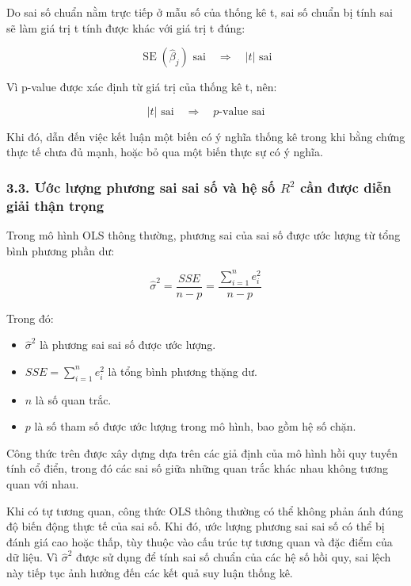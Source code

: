 Do sai số chuẩn nằm trực tiếp ở mẫu số của thống kê t, sai số chuẩn bị tính sai sẽ làm giá trị t tính được khác với giá trị t đúng:

\[
\widehat{\operatorname{SE}}(\hat{\beta}_j)
\text{ sai}
\quad \Rightarrow \quad
|t|
\text{ sai}
\]

Vì p-value được xác định từ giá trị của thống kê t, nên:

\[
|t|
\text{ sai}
\quad \Rightarrow \quad
p\text{-value sai}
\]

Khi đó, dẫn đến việc kết luận một biến có ý nghĩa thống kê trong khi bằng chứng thực tế chưa đủ mạnh, hoặc bỏ qua một biến thực sự có ý nghĩa.


\subsubsection{3.3. Ước lượng phương sai sai số và hệ số $R^2$ cần được diễn giải thận trọng}

Trong mô hình OLS thông thường, phương sai của sai số được ước lượng từ tổng bình phương phần dư:

\[
\hat{\sigma}^2
=
\frac{SSE}{n-p}
=
\frac{\sum_{i=1}^{n}e_i^2}{n-p}
\]

Trong đó:

\begin{itemize}
    \item $\hat{\sigma}^2$ là phương sai sai số được ước lượng.
    
    \item $SSE=\sum_{i=1}^{n}e_i^2$ là tổng bình phương thặng dư.
    
    \item $n$ là số quan trắc.
    
    \item $p$ là số tham số được ước lượng trong mô hình, bao gồm hệ số chặn.
\end{itemize}

Công thức trên được xây dựng dựa trên các giả định của mô hình hồi quy tuyến tính cổ điển, trong đó các sai số giữa những quan trắc khác nhau không tương quan với nhau.

Khi có tự tương quan, công thức OLS thông thường có thể không phản ánh đúng độ biến động thực tế của sai số. Khi đó, ước lượng phương sai sai số có thể bị đánh giá cao hoặc thấp, tùy thuộc vào cấu trúc tự tương quan và đặc điểm của dữ liệu. Vì $\hat{\sigma}^2$ được sử dụng để tính sai số chuẩn của các hệ số hồi quy, sai lệch này tiếp tục ảnh hưởng đến các kết quả suy luận thống kê.

